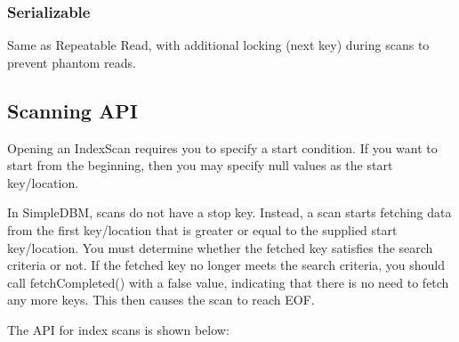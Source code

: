 \documentclass[a4paper,draft,oneside]{book}
\begin{document}
\subsubsection{Serializable}

Same as Repeatable Read, with additional locking (next key) during
scans to prevent phantom reads.

\subsection{Scanning API}

Opening an IndexScan requires you to specify a start condition.
If you want to start from the beginning, then you may specify null values
as the start key/location. 

In SimpleDBM, scans do not have a stop key. Instead, a scan starts fetching
data from the first key/location that is greater or equal to the supplied
start key/location. You must determine whether the fetched key satisfies
the search criteria or not. If the fetched key no longer meets the search
criteria, you should call fetchCompleted() with a false value, indicating that
there is no need to fetch any more keys. This then causes the scan to
reach EOF.

The API for index scans is shown below:
\end{document}
